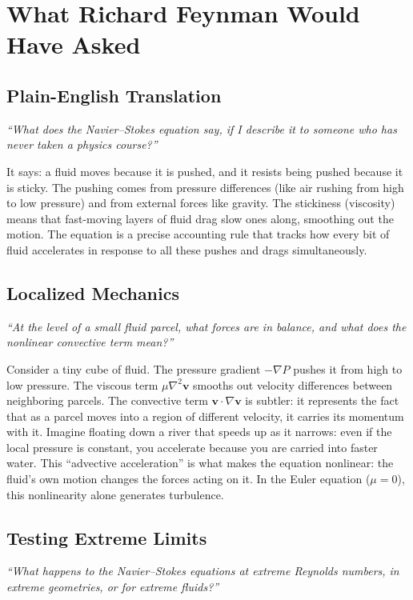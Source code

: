 \section*{What Richard Feynman Would Have Asked}

\subsection*{Plain-English Translation}
\textit{``What does the Navier--Stokes equation say, if I describe it to someone who has never taken a physics course?''}

It says: a fluid moves because it is pushed, and it resists being pushed because it is sticky. The pushing comes from pressure differences (like air rushing from high to low pressure) and from external forces like gravity. The stickiness (viscosity) means that fast-moving layers of fluid drag slow ones along, smoothing out the motion. The equation is a precise accounting rule that tracks how every bit of fluid accelerates in response to all these pushes and drags simultaneously.

\subsection*{Localized Mechanics}
\textit{``At the level of a small fluid parcel, what forces are in balance, and what does the nonlinear convective term mean?''}

Consider a tiny cube of fluid. The pressure gradient $-\nabla P$ pushes it from high to low pressure. The viscous term $\mu\nabla^{2}\mathbf{v}$ smooths out velocity differences between neighboring parcels. The convective term $\mathbf{v}\cdot\nabla\mathbf{v}$ is subtler: it represents the fact that as a parcel moves into a region of different velocity, it carries its momentum with it. Imagine floating down a river that speeds up as it narrows: even if the local pressure is constant, you accelerate because you are carried into faster water. This ``advective acceleration'' is what makes the equation nonlinear: the fluid's own motion changes the forces acting on it. In the Euler equation ($\mu = 0$), this nonlinearity alone generates turbulence.

\subsection*{Testing Extreme Limits}
\textit{``What happens to the Navier--Stokes equations at extreme Reynolds numbers, in extreme geometries, or for extreme fluids?''}

